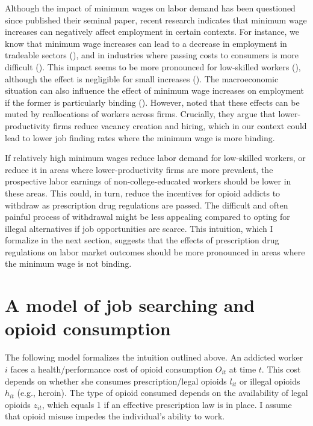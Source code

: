 \documentclass[12pt,a4paper]{article}
\begin{document}
Although the impact of minimum wages on labor demand has been questioned since \textcite{Card1994} published their seminal paper, recent research indicates that minimum wage increases can negatively affect employment in certain contexts.
For instance, we know that minimum wage increases can lead to a decrease in employment in tradeable sectors (\cite{Cengiz2019}), and in industries where passing costs to consumers is more difficult (\cite{Harasztosi2019}).
This impact seems to be more pronounced for low-skilled workers (\cite{Neumark2004}), although the effect is negligible for small increases (\cite{Clemens2021}).
The macroeconomic situation can also influence the effect of minimum wage increases on employment if the former is particularly binding (\cite{Clemens2019}). 
However, \textcite{Engbom2022} noted that these effects can be muted by reallocations of workers across firms.
Crucially, they argue that lower-productivity firms reduce vacancy creation and hiring, which in our context could lead to lower job finding rates where the minimum wage is more binding.

If relatively high minimum wages reduce labor demand for low-skilled workers, or reduce it in areas where lower-productivity firms are more prevalent, the prospective labor earnings of non-college-educated workers should be lower in these areas.
This could, in turn, reduce the incentives for opioid addicts to withdraw as prescription drug regulations are passed. 
The difficult and often painful process of withdrawal might be less appealing compared to opting for illegal alternatives if job opportunities are scarce.
This intuition, which I formalize in the next section, suggests that the effects of prescription drug regulations on labor market outcomes should be more pronounced in areas where the minimum wage is not binding.

\section*{A model of job searching and opioid consumption}

The following model formalizes the intuition outlined above. 
An addicted worker \(i\) faces a health/performance cost of opioid consumption \(O_{it}\) at time \(t\).
This cost depends on whether she consumes prescription/legal opioids \(l_{it}\) or illegal opioids \(h_{it}\) (e.g., heroin).
The type of opioid consumed depends on the availability of legal opioids \(z_{it}\), which equals 1 if an effective prescription law is in place.
I assume that opioid misuse impedes the individual's ability to work.
\end{document}

